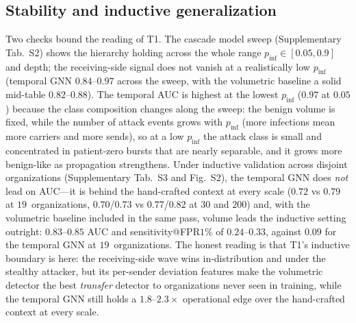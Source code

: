 \subsection{Stability and inductive generalization}
\label{sec:res-stability}
Two checks bound the reading of T1. The cascade model sweep (Supplementary Tab.~S2) shows the hierarchy
holding across the whole range $p_\mathrm{inf}\!\in\![0.05,0.9]$ and depth; the receiving-side signal does not
vanish at a realistically low $p_\mathrm{inf}$ (temporal GNN $0.84$--$0.97$ across the sweep, with the
volumetric baseline a solid mid-table $0.82$--$0.88$). The temporal AUC is highest at
the lowest $p_\mathrm{inf}$ ($0.97$ at $0.05$) because the class composition changes along the sweep: the
benign volume is fixed, while the number of attack events grows with $p_\mathrm{inf}$ (more infections mean
more carriers and more sends), so at a low $p_\mathrm{inf}$ the attack class is small and concentrated in
patient-zero bursts that are nearly separable, and it grows more benign-like as propagation strengthens.
Under inductive validation across disjoint organizations (Supplementary Tab.~S3 and Fig.~S2), the temporal
GNN does \emph{not} lead on AUC---it is behind the hand-crafted context at every scale ($0.72$ vs $0.79$ at
$19$~organizations, $0.70$/$0.73$ vs $0.77$/$0.82$ at $30$ and $200$) and, with the volumetric baseline
included in the same pass, volume leads the inductive setting outright: $0.83$--$0.85$ AUC and
sensitivity@FPR$1\%$ of $0.24$--$0.33$, against $0.09$ for the temporal GNN at $19$~organizations.
The honest reading is that T1's inductive boundary is here: the receiving-side wave wins in-distribution
and under the stealthy attacker, but its per-sender deviation features make the volumetric detector the
best \emph{transfer} detector to organizations never seen in training, while the temporal GNN still holds
a $1.8$--$2.3\times$ operational edge over the hand-crafted context at every scale.

